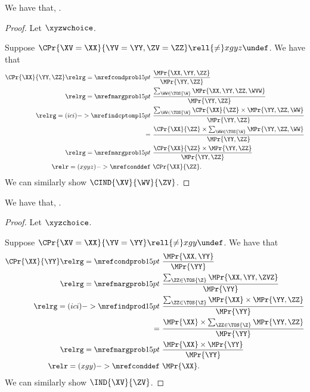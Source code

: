 \begin{proposition}
  We have that, \inddecompdefa.%
\end{proposition}

\begin{proof}
  Let $\xyzwchoice$.

  Suppose $\CPr{\XV = \XX}{\YV = \YY,\ZV = \ZZ} \rell {\ne} xgyz \undef$. We have that
  \begin{align*}
    \CPr{\XX}{\YY,\ZZ} \relrg = {\mrefcondprob} 15pt &\ \frac{\MPr{\XX,\YY,\ZZ}}{\MPr{\YY,\ZZ}}\\
    \relrg = {\mrefmargprob} 15pt &\ \frac{\sum_{\WW \in \TOS{\W}}\MPr{\XX,\YY,\ZZ,\WVW}}{\MPr{\YY,\ZZ}}\\
    \relrg = {(ici)->\mrefindcptomp} 15pt &\ \frac{\sum_{\WW \in \TOS{\W}}\CPr{\XX}{\ZZ}\times \MPr{\YY, \ZZ, \WW}}{\MPr{\YY,\ZZ}}\\
    = &\ \frac{\CPr{\XX}{\ZZ}\times \sum_{\WW \in \TOS{\W}}\MPr{\YY, \ZZ, \WW}}{\MPr{\YY,\ZZ}}\\
    \relrg = {\mrefmargprob} 15pt &\ \frac{\CPr{\XX}{\ZZ}\times \MPr{\YY, \ZZ}}{\MPr{\YY,\ZZ}}\\
    \relr = {(xgyz)->\mrefconddef} &\ \CPr{\XX}{\ZZ}.
  \end{align*}
  We can similarly show $\CIND{\XV}{\WV}{\ZV}$.
\end{proof}

\begin{proposition}
  We have that, \inddecompdefb.%
\end{proposition}

\begin{proof}
  Let $\xyzchoice$.

  Suppose $\CPr{\XV = \XX}{\YV = \YY} \rell {\ne} xgy \undef$. We have that
  \begin{align*}
    \CPr{\XX}{\YY} \relrg = {\mrefcondprob} 15pt &\ \frac{\MPr{\XX,\YY}}{\MPr{\YY}}\\
    \relrg = {\mrefmargprob} 15pt &\ \frac{\sum_{\ZZ \in \TOS{\Z}}\MPr{\XX,\YY,\ZVZ}}{\MPr{\YY}}\\
    \relrg = {(ici)->\mrefindprod} 15pt &\ \frac{\sum_{\ZZ \in \TOS{\Z}}\MPr{\XX}\times \MPr{\YY, \ZZ}}{\MPr{\YY}}\\
    = &\ \frac{\MPr{\XX}\times \sum_{\ZZ \in \TOS{\Z}}\MPr{\YY, \ZZ}}{\MPr{\YY}}\\
    \relrg = {\mrefmargprob} 15pt &\ \frac{\MPr{\XX}\times \MPr{\YY}}{\MPr{\YY}}\\
    \relr = {(xgy)->\mrefconddef} &\ \MPr{\XX}.
  \end{align*}
  We can similarly show $\IND{\XV}{\ZV}$.
\end{proof}
